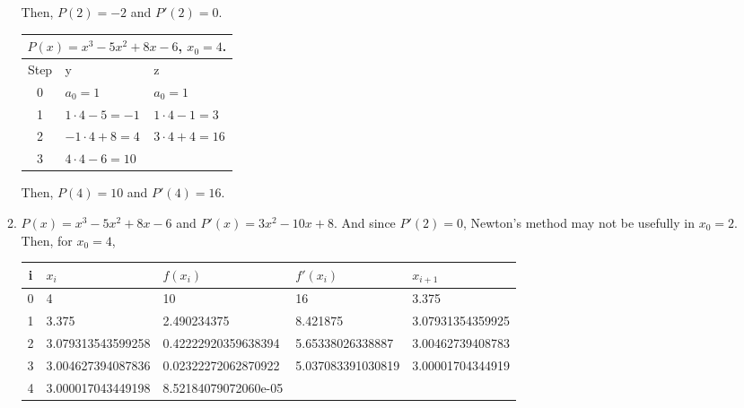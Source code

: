 \documentclass[12pt]{article}
\begin{document}
\begin{enumerate}
\begin{enumerate}
        Then, $P(2) = -2$ and $P'(2)=0$.

        \begin{tabular}{|c||p{5cm}|p{5cm}|}
            \hline
            \multicolumn{3}{|c|}{$P(x) = x^3 - 5x^2 + 8x -6$, $x_0 = 4$.}\\
            \hline
            Step & y & z\\
            \hline
            0 & $a_0 = 1$ & $a_0 = 1$\\
            1 & $1 \cdot 4 - 5 = -1$ & $1 \cdot 4 - 1 = 3$\\
            2 & $-1 \cdot 4 + 8 = 4$ & $3 \cdot 4 + 4 = 16$\\
            3 & $4 \cdot 4 - 6 = 10$ & \\
            \hline
        \end{tabular}

        Then, $P(4) = 10$ and $P'(4) = 16$.

        \item $P(x) = x^3 - 5x^2 + 8x -6$ and $P'(x) = 3x^2 - 10x + 8$.
        And since $P'(2) = 0$, Newton's method may not be usefully in $x_0 = 2$.
        Then, for $x_0 = 4$, 
        \begin{center}
            \begin{tabular}{|c|llll|}
                \hline
                i & $x_i$ & $f(x_i)$ & $f'(x_i)$ & $x_{i+1}$\\ 
                \hline
                0 & 4 & 10 & 16 & 3.375\\
                1 & 3.375 & 2.490234375 & 8.421875 & 3.07931354359925\\
                2 & 3.079313543599258 & 0.42222920359638394 & 5.65338026338887 & 3.00462739408783\\
                3 & 3.004627394087836 & 0.02322272062870922 & 5.037083391030819 & 3.00001704344919\\
                4 & 3.000017043449198 & 8.52184079072060e-05 & &\\
                \hline
            \end{tabular}
        \end{center}
        
    \end{enumerate}
\end{enumerate}
\end{document}
